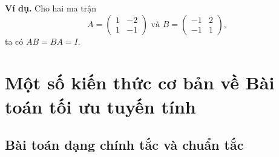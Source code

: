 \documentclass[12pt,a4paper]{report}
\begin{document}
\textbf{Ví dụ.} Cho hai ma trận
\begin{equation*}
A = \begin{pmatrix}
	1 & -2 \\
	1 & -1
	\end{pmatrix}
\text{ và }
B = \begin{pmatrix}
	-1 & 2 \\
	-1 & 1
	\end{pmatrix},
\end{equation*}
\hspace*{2cm} ta có $AB=BA=I$.
\section{Một số kiến thức cơ bản về Bài toán tối ưu tuyến tính}

\subsection{Bài toán dạng chính tắc và chuẩn tắc}
\end{document}
